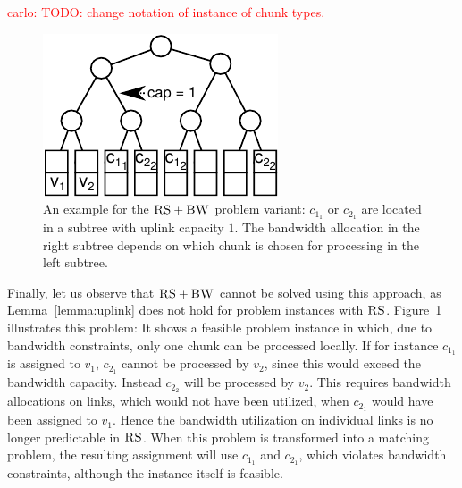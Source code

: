 \documentclass[9pt,twocolumn]{scrartcl}
\newcommand{\carlo}[1]{\textcolor{red}{carlo: #1}}
\newcommand{\VirtualNode}{v}
\newcommand{\achunk}{\ensuremath{c}}
\newcommand{\RS}{\textsc{RS}}
\newcommand{\BW}{\textsc{BW}}
\begin{document}
\carlo{TODO: change notation of instance of chunk types.}

\begin{figure}
 \includegraphics[width = \columnwidth]{figs/matching_no_rs}
 \caption{An example for the $\RS+\BW$ problem variant: $\achunk_{1_1}$ or $\achunk_{2_1}$ are
located in a subtree with uplink capacity $1$. The bandwidth allocation in the right
subtree depends on which chunk is chosen for processing in the left
subtree.}
 \label{fig:matching_no_rs}
\end{figure}


Finally, let us observe that $\RS+\BW$ cannot be solved using this approach, 
as Lemma~\ref{lemma:uplink} does not
hold for problem instances with $\RS$. Figure~\ref{fig:matching_no_rs}
illustrates this problem: It shows a feasible problem instance in which, due
to bandwidth constraints, only one chunk can be processed locally. If for
instance $\achunk_{1_1}$ is assigned to $\VirtualNode_1$, $\achunk_{2_1}$ cannot
be processed by $\VirtualNode_2$, since this would exceed the bandwidth
capacity. Instead $\achunk_{2_2}$ will be processed by $\VirtualNode_2$. This
requires bandwidth allocations on links, which would not have been utilized,
when $\achunk_{2_1}$ would have been assigned to $\VirtualNode_1$. Hence the
bandwidth utilization on individual links is no longer predictable in $\RS$.
When this problem is transformed into a matching problem, the resulting
assignment will use $\achunk_{1_1}$ and $\achunk_{2_1}$, which violates
bandwidth constraints, although the instance itself is feasible.
\end{document}
